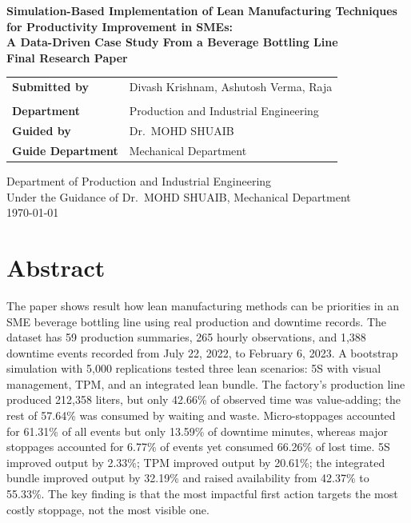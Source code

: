 \documentclass[12pt,a4paper]{article}
\begin{document}
\begin{titlepage}
\centering

{\Large \textbf{Simulation-Based Implementation of Lean Manufacturing Techniques for Productivity Improvement in SMEs:}}\\[0.3cm]
{\Large \textbf{A Data-Driven Case Study From a Beverage Bottling Line}}\\[1.2cm]

{\large \textbf{Final Research Paper}}\\[1cm]

\begin{tabular}{>{\bfseries}p{4.2cm}p{9.5cm}}
Submitted by & Divash Krishnam, Ashutosh Verma, Raja \\
  \\
Department & Production and Industrial Engineering \\
Guided by & Dr.\ MOHD SHUAIB \\
Guide Department & Mechanical Department \\
\end{tabular}

\vfill

{\large Department of Production and Industrial Engineering}\\[0.2cm]
{\large Under the Guidance of Dr.\ MOHD SHUAIB, Mechanical Department}\\[0.8cm]
{\large \today}

\end{titlepage}

\tableofcontents
\newpage

\section*{Abstract}
The paper shows result how lean manufacturing methods can be priorities in an SME beverage bottling line using real production and downtime records. The dataset has 59 production summaries, 265 hourly observations, and 1,388 downtime events recorded from July 22, 2022, to February 6, 2023. A bootstrap simulation with 5,000 replications tested three lean scenarios: 5S with visual management, TPM, and an integrated lean bundle. The factory's production line produced 212,358 liters, but only 42.66\% of observed time was value-adding; the rest of 57.64\% was consumed by waiting and waste. Micro-stoppages accounted for 61.31\% of all events but only 13.59\% of downtime minutes, whereas major stoppages accounted for 6.77\% of events yet consumed 66.26\% of lost time. 5S improved output by 2.33\%; TPM improved output by 20.61\%; the integrated bundle improved output by 32.19\% and raised availability from 42.37\% to 55.33\%. The key finding is that the most impactful first action targets the most costly stoppage, not the most visible one.
\end{document}

